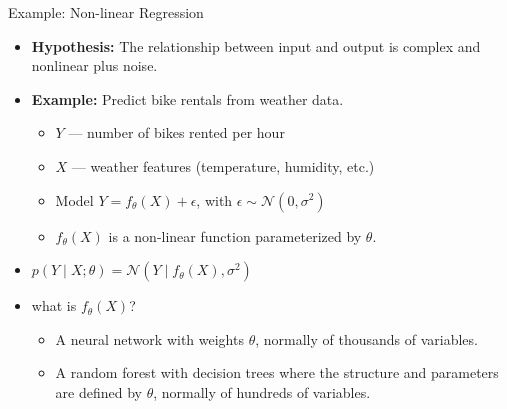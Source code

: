 \documentclass{beamer}
\begin{document}
\begin{frame}{Example: Non-linear Regression}
  \begin{itemize}
    \item \textbf{Hypothesis:} The relationship between input and output is complex and nonlinear plus noise.
    \item \textbf{Example:} Predict bike rentals from weather data.
      \begin{itemize}
        \item $Y$ — number of bikes rented per hour
        \item $X$ — weather features (temperature, humidity, etc.)
        \item Model $ Y = f_\theta(X) + \epsilon$, with $\epsilon \sim \mathcal{N}(0, \sigma^2)$
          \item $f_\theta(X)$ is a non-linear function parameterized by $\theta$.
          \end{itemize}
        \item $p(Y \mid X; \theta) = \mathcal{N}(Y \mid f_\theta(X), \sigma^2)$
        \item what is $f_\theta(X)$?
          \begin{itemize}
          \item A neural network with weights $\theta$, normally of thousands of variables.
          \item A random forest with decision trees where the structure and parameters are defined by $\theta$, normally of hundreds of variables.
          \end{itemize}
  \end{itemize}
\end{frame}
\end{document}
